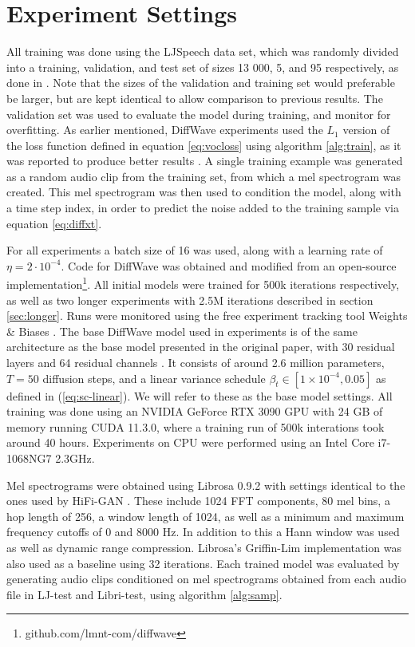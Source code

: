\documentclass{report}
\begin{document}
\section{Experiment Settings} \label{sec:settings}
All training was done using the LJSpeech data set, which was randomly divided into a training, validation, and test set of sizes 13 000, 5, and 95 respectively, as done in \cite{lee2021priorgrad}. Note that the sizes of the validation and training set would preferable be larger, but are kept identical to allow comparison to previous results. The validation set was used to evaluate the model during training, and monitor for overfitting. As earlier mentioned, DiffWave experiments used the $L_1$ version of the loss function defined in equation \ref{eq:vocloss} using algorithm \ref{alg:train}, as it was reported to produce better results \cite{chen2020wavegrad}. A single training example was generated as a random audio clip from the training set, from which a mel spectrogram was created. This mel spectrogram was then used to condition the model, along with a time step index, in order to predict the noise added to the training sample via equation \ref{eq:diffxt}.

For all experiments a batch size of 16 was used, along with a learning rate of $\eta = 2 \cdot 10^{-4}$. Code for DiffWave was obtained and modified from an open-source implementation\footnote{github.com/lmnt-com/diffwave}. All initial models were trained for 500k iterations respectively, as well as two longer experiments with 2.5M iterations described in section \ref{sec:longer}. Runs were monitored using the free experiment tracking tool Weights \& Biases \cite{wandb}. The base DiffWave model used in experiments is of the same architecture as the base model presented in the original paper, with 30 residual layers and 64 residual channels \cite{kong2020diffwave}. It consists of around 2.6 million parameters, $T=50$ diffusion steps, and a linear variance schedule $\beta_t \in [1 \times 10^{-4}, 0.05]$ as defined in (\ref{eq:sc-linear}). We will refer to these as the base model settings. All training was done using an NVIDIA GeForce RTX 3090 GPU with 24 GB of memory running CUDA 11.3.0, where a training run of 500k interations took around 40 hours. Experiments on CPU were performed using an Intel Core i7-1068NG7 2.3GHz.

Mel spectrograms were obtained using Librosa 0.9.2 with settings identical to the ones used by HiFi-GAN \cite{kong2020hifi}. These include 1024 FFT components, 80 mel bins, a hop length of 256, a window length of 1024, as well as a minimum and maximum frequency cutoffs of 0 and 8000 Hz. In addition to this a Hann window was used as well as dynamic range compression. Librosa's Griffin-Lim implementation was also used as a baseline using 32 iterations. Each trained model was evaluated by generating audio clips conditioned on mel spectrograms obtained from each audio file in LJ-test and Libri-test, using algorithm \ref{alg:samp}.
\end{document}
